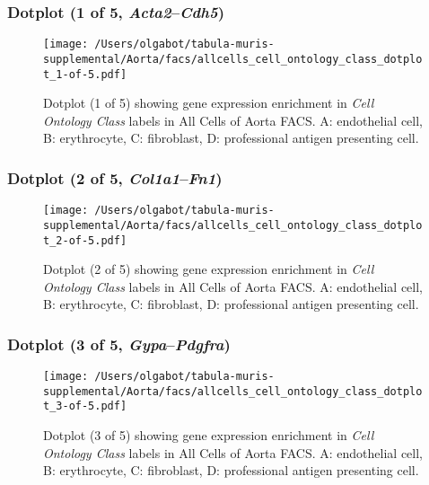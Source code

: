 \clearpage

\subsubsection{Dotplot (1 of 5, \emph{Acta2}--\emph{Cdh5})}
\begin{figure}[h]
\centering
\texttt{[image: /Users/olgabot/tabula-muris-supplemental/Aorta/facs/allcells\_cell\_ontology\_class\_dotplot\_1-of-5.pdf]}

\caption{ Dotplot (1 of 5)  showing gene expression enrichment in \emph{Cell Ontology Class} labels in All Cells of Aorta FACS. A: endothelial cell, B: erythrocyte, C: fibroblast, D: professional antigen presenting cell.}
\end{figure}


\clearpage

\subsubsection{Dotplot (2 of 5, \emph{Col1a1}--\emph{Fn1})}
\begin{figure}[h]
\centering
\texttt{[image: /Users/olgabot/tabula-muris-supplemental/Aorta/facs/allcells\_cell\_ontology\_class\_dotplot\_2-of-5.pdf]}

\caption{ Dotplot (2 of 5)  showing gene expression enrichment in \emph{Cell Ontology Class} labels in All Cells of Aorta FACS. A: endothelial cell, B: erythrocyte, C: fibroblast, D: professional antigen presenting cell.}
\end{figure}


\clearpage

\subsubsection{Dotplot (3 of 5, \emph{Gypa}--\emph{Pdgfra})}
\begin{figure}[h]
\centering
\texttt{[image: /Users/olgabot/tabula-muris-supplemental/Aorta/facs/allcells\_cell\_ontology\_class\_dotplot\_3-of-5.pdf]}

\caption{ Dotplot (3 of 5)  showing gene expression enrichment in \emph{Cell Ontology Class} labels in All Cells of Aorta FACS. A: endothelial cell, B: erythrocyte, C: fibroblast, D: professional antigen presenting cell.}
\end{figure}


\clearpage

